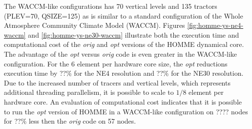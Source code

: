 The WACCM-like configurations has 70 vertical levels and 135 tractors (PLEV=70, QSIZE=125) as is similar to a standard configuration of the Whole Atmosphere Community Climate Model (WACCM).  Figures \ref{fig:homme-ys-ne4-waccm} and \ref{fig:homme-ys-ne30-waccm} illustrate both the execution time and computational cost of the {\em orig} and {\em opt} versions of the HOMME dynamical core.  The advantage of the {\em opt} versus {\em orig} code is even greater in the WACCM-like configuration.  For the 6 element per hardware core size, the {\em opt} reductions execution time by ??\% for the NE4 resolution and ??\% for the NE30 resolution. Due to the increased number of tracers and vertical levels, which represents additional threading parallelism, it is possible to scale to $1/8$ element per hardware core.  An evaluation of computational cost indicates that it is possible to run the {\em opt} version of HOMME in a WACCM-like configuration on ???? nodes for ??\% less then the {\em orig} code on 57 nodes.  

